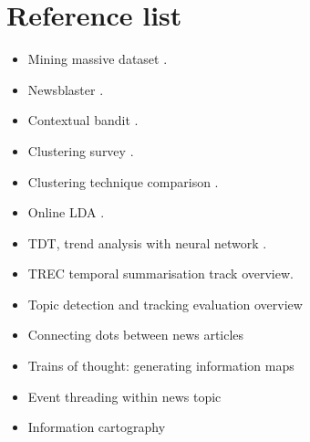 \documentclass[12pt]{article}
\begin{document}
\section{Reference list}
\begin{itemize}[noitemsep]
\item Mining massive dataset \cite{mining2012}.
\item Newsblaster \cite{newsblaster}.
\item Contextual bandit \cite{contextual:li2010}.
\item Clustering survey \cite{clusteringsurvey}.
\item Clustering technique comparison \cite{ctechniquecomp}.
\item Online LDA \cite{onlinelda}.
\item TDT, trend analysis with neural network \cite{tdttanalysis}.
\item TREC temporal summarisation track overview. \cite{trects2014}
\item Topic detection and tracking evaluation overview \cite{tdtoverview}
\item Connecting dots between news articles \cite{connectingdots}
\item Trains of thought: generating information maps \cite{informationmaps}
\item Event threading within news topic \cite{eventthreading}
\item Information cartography \cite{infocartography}
\end{itemize}

\newpage



\end{document}
